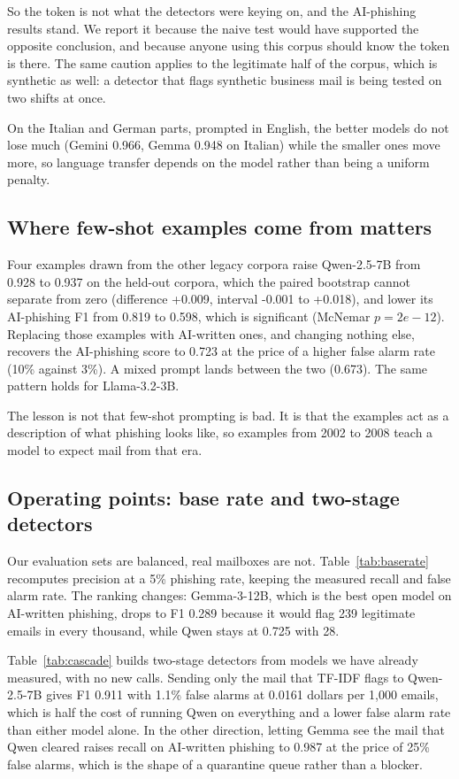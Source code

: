 So the token is not what the detectors were keying on, and the AI-phishing
results stand. We report it because the naive test would have supported the
opposite conclusion, and because anyone using this corpus should know the
token is there. The same caution applies to the legitimate half of the corpus,
which is synthetic as well: a detector that flags synthetic business mail is
being tested on two shifts at once.

On the Italian and German parts, prompted in English, the better models do not
lose much (Gemini 0.966, Gemma 0.948 on Italian) while the smaller
ones move more, so language transfer depends on the model rather than being a
uniform penalty.



\subsection{Where few-shot examples come from matters}

Four examples drawn from the other legacy corpora raise Qwen-2.5-7B from
0.928 to 0.937 on the held-out corpora, which the paired
bootstrap cannot separate from zero (difference +0.009, interval -0.001 to +0.018), and lower its AI-phishing F1
from 0.819 to 0.598, which is significant (McNemar $p=2e-12$). Replacing
those examples with AI-written ones, and changing nothing else, recovers the
AI-phishing score to 0.723 at the price of a higher false alarm rate
(10\% against 3\%). A mixed prompt lands between the two
(0.673). The same pattern holds for Llama-3.2-3B.

The lesson is not that few-shot prompting is bad. It is that the examples act
as a description of what phishing looks like, so examples from 2002 to 2008
teach a model to expect mail from that era.

\subsection{Operating points: base rate and two-stage detectors}

Our evaluation sets are balanced, real mailboxes are not.
Table~\ref{tab:baserate} recomputes precision at a 5\% phishing rate, keeping
the measured recall and false alarm rate. The ranking changes: Gemma-3-12B,
which is the best open model on AI-written phishing, drops to F1 0.289
because it would flag 239 legitimate emails in every thousand, while
Qwen stays at 0.725 with 28.

Table~\ref{tab:cascade} builds two-stage detectors from models we have already
measured, with no new calls. Sending only the mail that TF-IDF flags to
Qwen-2.5-7B gives F1 0.911 with 1.1\% false alarms at
0.0161 dollars per 1{,}000 emails, which is half the cost of running Qwen
on everything and a lower false alarm rate than either model alone. In the
other direction, letting Gemma see the mail that Qwen cleared raises recall on
AI-written phishing to 0.987 at the price of 25\% false alarms,
which is the shape of a quarantine queue rather than a blocker.

